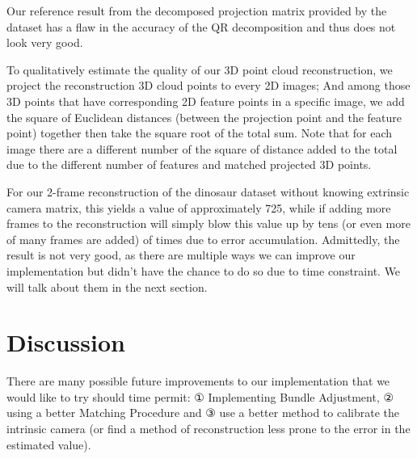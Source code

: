\documentclass[10pt]{article}
\begin{document}
Our reference result from the decomposed projection matrix provided by the dataset has a flaw in the accuracy of the QR decomposition and thus does not look very good.

To qualitatively estimate the quality of our 3D point cloud reconstruction, we project the reconstruction 3D cloud points to every 2D images; And among those 3D points that have corresponding 2D feature points in a specific image, we add the square of Euclidean distances (between the projection point and the feature point) together then take the square root of the total sum. Note that for each image there are a different number of the square of distance added to the total due to the different number of features and matched projected 3D points.

For our 2-frame reconstruction of the dinosaur dataset without knowing extrinsic camera matrix, this yields a value of approximately 725, while if adding more frames to the reconstruction will simply blow this value up by tens (or even more of many frames are added) of times due to error accumulation. Admittedly, the result is not very good, as there are multiple ways we can improve our implementation but didn't have the chance to do so due to time constraint. We will talk about them in the next section.


\section*{Discussion}

There are many possible future improvements to our implementation that we would like to try should time permit: ① Implementing Bundle Adjustment, ② using a better Matching Procedure and ③ use a better method to calibrate the intrinsic camera (or find a method of reconstruction less prone to the error in the estimated value). 
\end{document}
